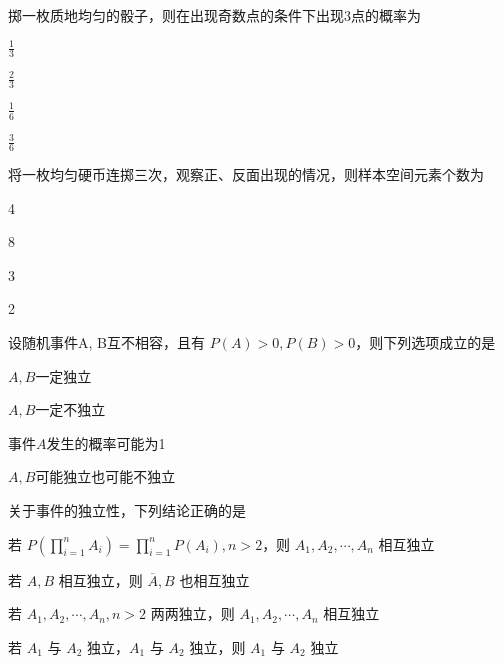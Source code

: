 \documentclass{exam-zh}
\begin{document}
\begin{question}
  掷一枚质地均匀的骰子，则在出现奇数点的条件下出现3点的概率为 \paren[A]
  \begin{choices}
    \item $\frac{1}{3}$
    \item $\frac{2}{3}$
    \item $\frac{1}{6}$
    \item $\frac{3}{6}$
  \end{choices}
\end{question}

\begin{question}
  将一枚均匀硬币连掷三次，观察正、反面出现的情况，则样本空间元素个数为 \paren[B]
  \begin{choices}
   \item 4
   \item 8
   \item 3
   \item 2
  \end{choices}
\end{question}

\begin{question}
  设随机事件A, B互不相容，且有 $ P(A) > 0, P(B) > 0 $，则下列选项成立的是 \paren[B]
  \begin{choices}
    \item $A,B$一定独立  
    \item $A,B$一定不独立  
    \item 事件$A$发生的概率可能为1  
    \item $A,B$可能独立也可能不独立  
  \end{choices}
\end{question}

\begin{question}
  关于事件的独立性，下列结论正确的是 \paren[B]
  \begin{choices}
    \item 若 $P\left(\prod_{i=1}^{n} A_i\right) = \prod_{i=1}^{n} P(A_i), n > 2$，则 $A_1, A_2, \cdots, A_n$ 相互独立
    \item 若 $A, B$ 相互独立，则 $\overline{A}, B$ 也相互独立
    \item 若 $A_1, A_2, \cdots, A_n, n > 2$ 两两独立，则 $A_1, A_2, \cdots, A_n$ 相互独立
    \item 若 $A_1$ 与 $A_2$ 独立，$A_1$ 与 $A_2$ 独立，则 $A_1$ 与 $A_2$ 独立
  \end{choices}
\end{question}
\end{document}
